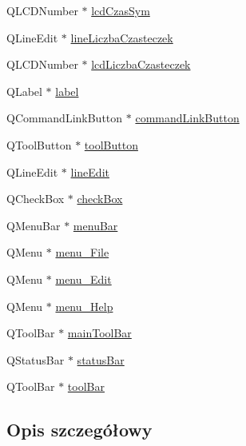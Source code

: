 \begin{DoxyCompactItemize}
\item 
Q\-L\-C\-D\-Number $\ast$ \hyperlink{class_ui___d_main_window_af49335a21dc17e53674f8b62a640ca2d}{lcd\-Czas\-Sym}
\item 
Q\-Line\-Edit $\ast$ \hyperlink{class_ui___d_main_window_a49c95cda7e035087a4367514e5540298}{line\-Liczba\-Czasteczek}
\item 
Q\-L\-C\-D\-Number $\ast$ \hyperlink{class_ui___d_main_window_a3d6afe29d882b3a9119b68d79c9b5e0f}{lcd\-Liczba\-Czasteczek}
\item 
Q\-Label $\ast$ \hyperlink{class_ui___d_main_window_aa528e417bc72cda19dfcea49f1617b2a}{label}
\item 
Q\-Command\-Link\-Button $\ast$ \hyperlink{class_ui___d_main_window_a0d790fbf37bac850b60a7cb42d100315}{command\-Link\-Button}
\item 
Q\-Tool\-Button $\ast$ \hyperlink{class_ui___d_main_window_a97093acead8089d7f4b26fab4b1c8a65}{tool\-Button}
\item 
Q\-Line\-Edit $\ast$ \hyperlink{class_ui___d_main_window_a26b955a365ed5865f327921708f1a72f}{line\-Edit}
\item 
Q\-Check\-Box $\ast$ \hyperlink{class_ui___d_main_window_a41e765e074811602fbc5efecf07011ac}{check\-Box}
\item 
Q\-Menu\-Bar $\ast$ \hyperlink{class_ui___d_main_window_a788ef749d82ca070e467e55cca0d47dd}{menu\-Bar}
\item 
Q\-Menu $\ast$ \hyperlink{class_ui___d_main_window_a991f4d15852faf04d8c12694b3e077ad}{menu\-\_\-\-File}
\item 
Q\-Menu $\ast$ \hyperlink{class_ui___d_main_window_a8826a3e34a5aa75fca2b8e45b7010a8b}{menu\-\_\-\-Edit}
\item 
Q\-Menu $\ast$ \hyperlink{class_ui___d_main_window_ac2997077098614d72b21d29c7a48350c}{menu\-\_\-\-Help}
\item 
Q\-Tool\-Bar $\ast$ \hyperlink{class_ui___d_main_window_a2e1da3781ee1e5913b25b85f4c29b97f}{main\-Tool\-Bar}
\item 
Q\-Status\-Bar $\ast$ \hyperlink{class_ui___d_main_window_ac9e025e7279839dd7ab1686456d1ae21}{status\-Bar}
\item 
Q\-Tool\-Bar $\ast$ \hyperlink{class_ui___d_main_window_abba1dae1dd835c7a7dd39da623cd4580}{tool\-Bar}
\end{DoxyCompactItemize}


\subsection{Opis szczegółowy}


